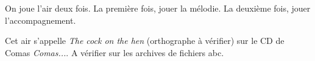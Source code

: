 On joue l'air deux fois. La première fois, jouer la mélodie. La deuxième fois,
jouer l'accompagnement.

\tune

Cet air s'appelle \emph{The cock on the hen} (orthographe à vérifier) sur le
CD de Comas \emph{Comas...}. A vérifier sur les archives de fichiers abc.
